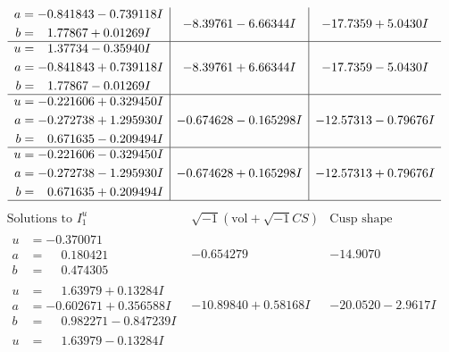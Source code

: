 \documentclass[1p]{elsarticle_modified}
\theoremstyle{definition}
\newcommand{\I}{\sqrt{-1}}
\begin{document}
$$\begin{array}{c|c|c}
\begin{aligned}
a &= -0.841843 - 0.739118 I \\
b &= \phantom{-}1.77867 + 0.01269 I\end{aligned}
 & -8.39761 - 6.66344 I & -17.7359 + 5.0430 I \\ \hline\begin{aligned}
u &= \phantom{-}1.37734 - 0.35940 I \\
a &= -0.841843 + 0.739118 I \\
b &= \phantom{-}1.77867 - 0.01269 I\end{aligned}
 & -8.39761 + 6.66344 I & -17.7359 - 5.0430 I \\ \hline\begin{aligned}
u &= -0.221606 + 0.329450 I \\
a &= -0.272738 + 1.295930 I \\
b &= \phantom{-}0.671635 - 0.209494 I\end{aligned}
 & -0.674628 - 0.165298 I & -12.57313 - 0.79676 I \\ \hline\begin{aligned}
u &= -0.221606 - 0.329450 I \\
a &= -0.272738 - 1.295930 I \\
b &= \phantom{-}0.671635 + 0.209494 I\end{aligned}
 & -0.674628 + 0.165298 I & -12.57313 + 0.79676 I\\
 \hline 
 \end{array}$$\newpage$$\begin{array}{c|c|c}  
\text{Solutions to }I^u_{1}& \I (\text{vol} + \sqrt{-1}CS) & \text{Cusp shape}\\
 \hline 
\begin{aligned}
u &= -0.370071\phantom{ +0.000000I} \\
a &= \phantom{-}0.180421\phantom{ +0.000000I} \\
b &= \phantom{-}0.474305\phantom{ +0.000000I}\end{aligned}
 & -0.654279\phantom{ +0.000000I} & -14.9070\phantom{ +0.000000I} \\ \hline\begin{aligned}
u &= \phantom{-}1.63979 + 0.13284 I \\
a &= -0.602671 + 0.356588 I \\
b &= \phantom{-}0.982271 - 0.847239 I\end{aligned}
 & -10.89840 + 0.58168 I & -20.0520 - 2.9617 I \\ \hline\begin{aligned}
u &= \phantom{-}1.63979 - 0.13284 I \\

\end{aligned}
\end{array}$$
\end{document}
